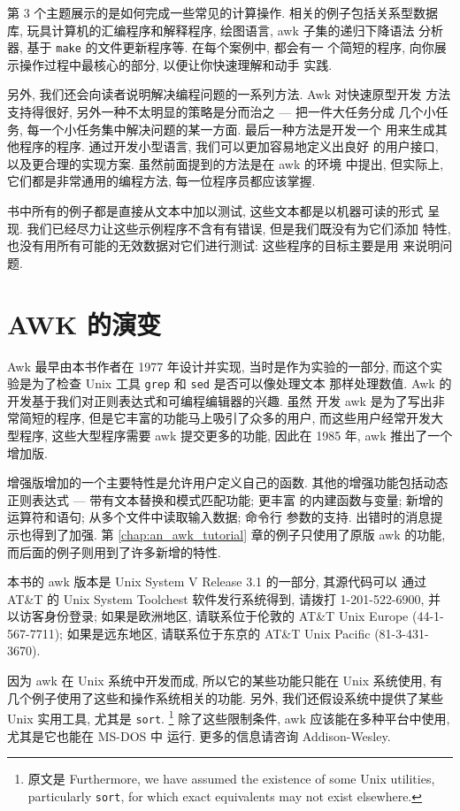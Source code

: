 第 3 个主题展示的是如何完成一些常见的计算操作. 相关的例子包括关系型数据
库, 玩具计算机的汇编程序和解释程序, 绘图语言, awk 子集的递归下降语法
分析器, 基于 \texttt{make} 的文件更新程序等. 在每个案例中, 都会有一
个简短的程序, 向你展示操作过程中最核心的部分, 以便让你快速理解和动手
实践.

另外, 我们还会向读者说明解决编程问题的一系列方法. Awk 对快速原型开发
方法支持得很好, 另外一种不太明显的策略是分而治之 --- 把一件大任务分成
几个小任务, 每一个小任务集中解决问题的某一方面. 最后一种方法是开发一个
用来生成其他程序的程序. 通过开发小型语言, 我们可以更加容易地定义出良好
的用户接口, 以及更合理的实现方案. 虽然前面提到的方法是在 awk 的环境
中提出, 但实际上, 它们都是非常通用的编程方法, 每一位程序员都应该掌握.

书中所有的例子都是直接从文本中加以测试, 这些文本都是以机器可读的形式
呈现. 我们已经尽力让这些示例程序不含有有错误, 但是我们既没有为它们添加
特性, 也没有用所有可能的无效数据对它们进行测试: 这些程序的目标主要是用
来说明问题.

\section*{AWK 的演变}

Awk 最早由本书作者在 1977 年设计并实现, 当时是作为实验的一部分, 而这个实
验是为了检查 Unix 工具 \texttt{grep} 和 \texttt{sed} 是否可以像处理文本
那样处理数值. Awk 的开发基于我们对正则表达式和可编程编辑器的兴趣. 虽然 
开发 awk 是为了写出非常简短的程序, 但是它丰富的功能马上吸引了众多的用户,
而这些用户经常开发大型程序, 这些大型程序需要 awk 提交更多的功能, 因此在
1985 年, awk 推出了一个增加版.

增强版增加的一个主要特性是允许用户定义自己的函数.
其他的增强功能包括动态正则表达式 --- 带有文本替换和模式匹配功能; 更丰富
的内建函数与变量; 新增的运算符和语句; 从多个文件中读取输入数据; 命令行 
参数的支持. 出错时的消息提示也得到了加强. 第 \ref{chap:an_awk_tutorial}
章的例子只使用了原版 awk 的功能, 而后面的例子则用到了许多新增的特性.

本书的 awk 版本是 Unix System V Release 3.1 的一部分, 其源代码可以
通过 AT\&T 的 Unix System Toolchest 软件发行系统得到, 请拨打 
1-201-522-6900, 并以访客身份登录; 如果是欧洲地区, 请联系位于伦敦的 AT\&T
Unix Europe (44-1-567-7711); 如果是远东地区, 请联系位于东京的
AT\&T Unix Pacific (81-3-431-3670).

因为 awk 在 Unix 系统中开发而成, 所以它的某些功能只能在 Unix 系统使用,
有几个例子使用了这些和操作系统相关的功能.
另外, 我们还假设系统中提供了某些 Unix 实用工具, 尤其是  \texttt{sort}.
\footnote{原文是 Furthermore, we have assumed the existence of some Unix
    utilities, particularly \texttt{sort}, for which exact equivalents may
not exist elsewhere.}
除了这些限制条件, awk 应该能在多种平台中使用, 尤其是它也能在 MS-DOS 中
运行. 更多的信息请咨询 Addison-Wesley.

